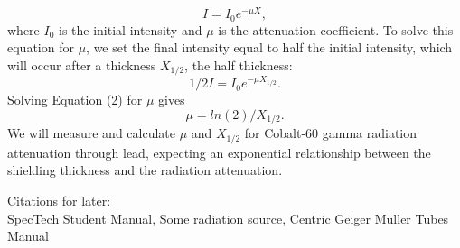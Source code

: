 \begin{equation}
I = I_0e^{-\mu X},
\end{equation}
where $I_0$ is the initial intensity and $\mu$ is the attenuation coefficient. To solve this equation for $\mu$, we set the final intensity equal to half the initial intensity, which will occur after a thickness $X_{1/2}$, the half thickness:
\begin{equation}
1/2 I = I_0e^{-\mu X_{1/2}}.
\end{equation}
Solving Equation (2) for $\mu$ gives
\begin{equation}
\mu = ln(2)/{X_{1/2}}.
\end{equation}
We will measure and calculate $\mu$ and $X_{1/2}$ for Cobalt-60 gamma radiation attenuation through lead, expecting an exponential relationship between the shielding thickness and the radiation attenuation\cite{Student Manual}. 

Citations for later: \\
SpecTech Student Manual,
Some radiation source,
Centric Geiger Muller Tubes Manual